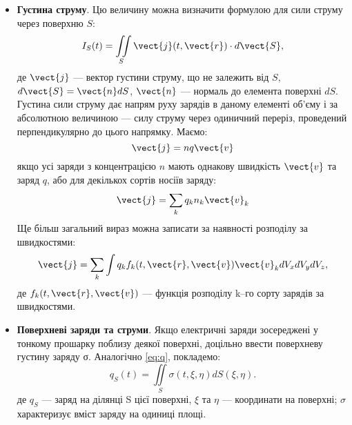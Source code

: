 \begin{itemize}
\item \textbf{Густина струму}. Цю величину можна визначити формулою для сили
струму через поверхню $S$:
\begin{equation}
    I_S(t) = \iint\limits_S \vect{j}(t, \vect{r})\cdot d\vect{S},
\end{equation}
де $\vect{j}$ --- вектор густини струму, що не залежить від $S$, $d\vect{S} = \vect{n} dS$, $\vect{n}$ --- нормаль до
елемента поверхні $dS$. Густина сили струму дає напрям руху зарядів в даному
елементі об’єму і за абсолютною величиною --- силу струму через одиничний
переріз, проведений перпендикулярно до цього напрямку. Маємо:
\begin{equation}
    \vect{j} = nq\vect{v}
\end{equation}
якщо усі заряди з концентрацією $n$ мають однакову швидкість $\vect{v}$ та заряд $q$,
або для декількох сортів носіїв заряду:
\begin{equation}
\vect{j} = \sum\limits_k q_k n_k\vect{v}_k
\end{equation}
Ще більш загальний вираз можна записати за наявності розподілу за
швидкостями:
\begin{equation}
\vect{j} = \sum\limits_k \int  q_k f_k(t, \vect{r}, \vect{v}) \vect{v}_k dV_xdV_ydV_z,
\end{equation}
де $f_k(t, \vect{r}, \vect{v})$ --- функція розподілу k–го сорту зарядів за швидкостями.


\item \textbf{Поверхневі заряди та струми}.  Якщо електричні заряди зосереджені у
тонкому прошарку поблизу деякої поверхні, доцільно ввести поверхневу
густину заряду σ. Аналогічно \eqref{eq:q}, покладемо:
\begin{equation}
    q_S(t) = \iint\limits_S \sigma(t, \xi, \eta) dS(\xi, \eta).
\end{equation}
де $q_S$ --- заряд на ділянці S цієї поверхні, $\xi$ та $\eta$ --- координати на поверхні; $\sigma$
характеризує вміст заряду на одиниці площі.


\begin{SCfigure}[2][h!]
    \centering
\caption{}
\label{surface_current}
\end{SCfigure}


\end{itemize}
